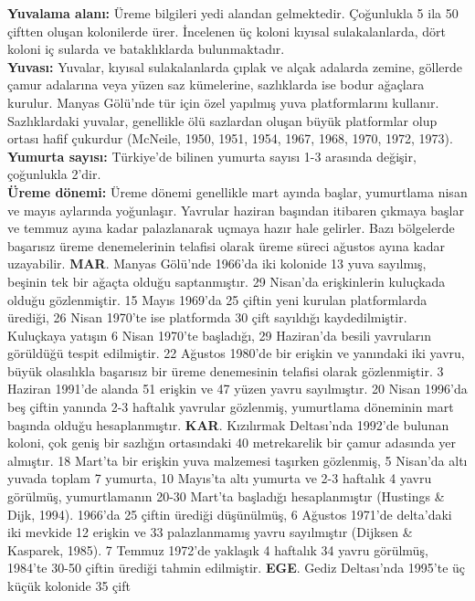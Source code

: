 \documentclass[
  a4paper,
  DIV=11,
  numbers=noendperiod]{scrreprt}
\begin{document}
\textbf{Yuvalama alanı:} Üreme bilgileri yedi alandan gelmektedir.
Çoğunlukla 5 ila 50 çiftten oluşan kolonilerde ürer. İncelenen üç koloni
kıyısal sulakalanlarda, dört koloni iç sularda ve bataklıklarda
bulunmaktadır.\\
\textbf{Yuvası:} Yuvalar, kıyısal sulakalanlarda çıplak ve alçak
adalarda zemine, göllerde çamur adalarına veya yüzen saz kümelerine,
sazlıklarda ise bodur ağaçlara kurulur. Manyas Gölü'nde tür için özel
yapılmış yuva platformlarını kullanır. Sazlıklardaki yuvalar, genellikle
ölü sazlardan oluşan büyük platformlar olup ortası hafif çukurdur
(McNeile, 1950, 1951, 1954, 1967, 1968, 1970, 1972, 1973).\\
\textbf{Yumurta sayısı:} Türkiye'de bilinen yumurta sayısı 1-3 arasında
değişir, çoğunlukla 2'dir.\\
\textbf{Üreme dönemi:} Üreme dönemi genellikle mart ayında başlar,
yumurtlama nisan ve mayıs aylarında yoğunlaşır. Yavrular haziran
başından itibaren çıkmaya başlar ve temmuz ayına kadar palazlanarak
uçmaya hazır hale gelirler. Bazı bölgelerde başarısız üreme
denemelerinin telafisi olarak üreme süreci ağustos ayına kadar
uzayabilir. \textbf{MAR}. Manyas Gölü'nde 1966'da iki kolonide 13 yuva
sayılmış, beşinin tek bir ağaçta olduğu saptanmıştır. 29 Nisan'da
erişkinlerin kuluçkada olduğu gözlenmiştir. 15 Mayıs 1969'da 25 çiftin
yeni kurulan platformlarda ürediği, 26 Nisan 1970'te ise platformda 30
çift sayıldığı kaydedilmiştir. Kuluçkaya yatışın 6 Nisan 1970'te
başladığı, 29 Haziran'da besili yavruların görüldüğü tespit edilmiştir.
22 Ağustos 1980'de bir erişkin ve yanındaki iki yavru, büyük olasılıkla
başarısız bir üreme denemesinin telafisi olarak gözlenmiştir. 3 Haziran
1991'de alanda 51 erişkin ve 47 yüzen yavru sayılmıştır. 20 Nisan
1996'da beş çiftin yanında 2-3 haftalık yavrular gözlenmiş, yumurtlama
döneminin mart başında olduğu hesaplanmıştır. \textbf{KAR}. Kızılırmak
Deltası'nda 1992'de bulunan koloni, çok geniş bir sazlığın ortasındaki
40 metrekarelik bir çamur adasında yer almıştır. 18 Mart'ta bir erişkin
yuva malzemesi taşırken gözlenmiş, 5 Nisan'da altı yuvada toplam 7
yumurta, 10 Mayıs'ta altı yumurta ve 2-3 haftalık 4 yavru görülmüş,
yumurtlamanın 20-30 Mart'ta başladığı hesaplanmıştır (Hustings \& Dijk,
1994). 1966'da 25 çiftin ürediği düşünülmüş, 6 Ağustos 1971'de
delta'daki iki mevkide 12 erişkin ve 33 palazlanmamış yavru sayılmıştır
(Dijksen \& Kasparek, 1985). 7 Temmuz 1972'de yaklaşık 4 haftalık 34
yavru görülmüş, 1984'te 30-50 çiftin ürediği tahmin edilmiştir.
\textbf{EGE}. Gediz Deltası'nda 1995'te üç küçük kolonide 35 çift
\end{document}

